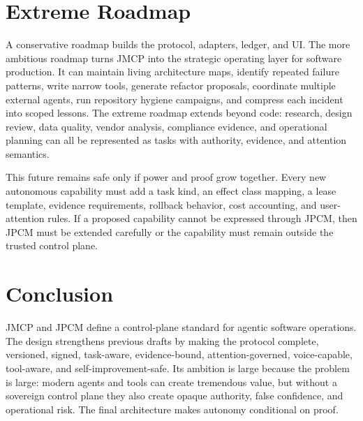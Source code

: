 \documentclass[10pt,journal,onecolumn]{IEEEtran}
\begin{document}
\section{Extreme Roadmap}
A conservative roadmap builds the protocol, adapters, ledger, and UI. The more ambitious roadmap turns JMCP into the strategic operating layer for software production. It can maintain living architecture maps, identify repeated failure patterns, write narrow tools, generate refactor proposals, coordinate multiple external agents, run repository hygiene campaigns, and compress each incident into scoped lessons. The extreme roadmap extends beyond code: research, design review, data quality, vendor analysis, compliance evidence, and operational planning can all be represented as tasks with authority, evidence, and attention semantics.

This future remains safe only if power and proof grow together. Every new autonomous capability must add a task kind, an effect class mapping, a lease template, evidence requirements, rollback behavior, cost accounting, and user-attention rules. If a proposed capability cannot be expressed through JPCM, then JPCM must be extended carefully or the capability must remain outside the trusted control plane.

\section{Conclusion}
JMCP and JPCM define a control-plane standard for agentic software operations. The design strengthens previous drafts by making the protocol complete, versioned, signed, task-aware, evidence-bound, attention-governed, voice-capable, tool-aware, and self-improvement-safe. Its ambition is large because the problem is large: modern agents and tools can create tremendous value, but without a sovereign control plane they also create opaque authority, false confidence, and operational risk. The final architecture makes autonomy conditional on proof.
\end{document}
